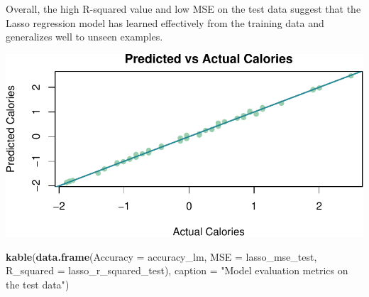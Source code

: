 \documentclass[
]{article}
\newenvironment{Shaded}{\begin{snugshade}}{\end{snugshade}}
\newcommand{\AttributeTok}[1]{\textcolor[rgb]{0.13,0.29,0.53}{#1}}
\newcommand{\DecValTok}[1]{\textcolor[rgb]{0.00,0.00,0.81}{#1}}
\newcommand{\FunctionTok}[1]{\textcolor[rgb]{0.13,0.29,0.53}{\textbf{#1}}}
\newcommand{\NormalTok}[1]{#1}
\newcommand{\OtherTok}[1]{\textcolor[rgb]{0.56,0.35,0.01}{#1}}
\newcommand{\SpecialCharTok}[1]{\textcolor[rgb]{0.81,0.36,0.00}{\textbf{#1}}}
\newcommand{\StringTok}[1]{\textcolor[rgb]{0.31,0.60,0.02}{#1}}
\begin{document}
Overall, the high R-squared value and low MSE on the test data suggest
that the Lasso regression model has learned effectively from the
training data and generalizes well to unseen examples.

\begin{Shaded}
\end{Shaded}

\begin{center}\includegraphics{Statistical_Learning_Final_Report_files/figure-latex/accuracy_lm-1} \end{center}

\begin{Shaded}
\begin{Highlighting}[]
\FunctionTok{kable}\NormalTok{(}\FunctionTok{data.frame}\NormalTok{(}\AttributeTok{Accuracy =}\NormalTok{ accuracy\_lm, }\AttributeTok{MSE =}\NormalTok{ lasso\_mse\_test, }
                 \AttributeTok{R\_squared =}\NormalTok{ lasso\_r\_squared\_test),}
      \AttributeTok{caption =} \StringTok{"Model evaluation metrics on the test data"}\NormalTok{)}
\end{Highlighting}
\end{Shaded}
\end{document}
